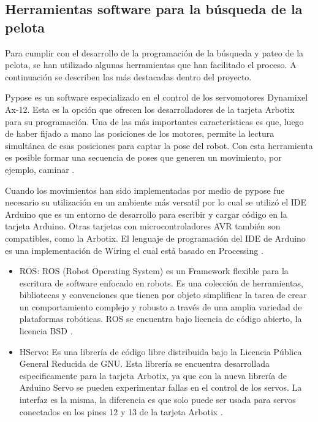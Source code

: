 \subsection{Herramientas software para la b\'usqueda de la pelota } \label{subsection:Herrbusqueda}

Para cumplir con el desarrollo de la programación de la búsqueda y pateo de la pelota, se han utilizado algunas herramientas que han facilitado el proceso. A continuación se describen las más destacadas dentro del proyecto. 

Pypose es un software especializado en el control de los servomotores Dynamixel Ax-12. Esta es la opci\'on que ofrecen los desarrolladores de la tarjeta Arbotix para su programaci\'on. Una de las más importantes características es que, luego de haber fijado a mano las posiciones de los motores, permite la lectura simultánea de esas posiciones para captar la pose del robot. Con esta herramienta es posible formar una secuencia de poses que generen un movimiento, por ejemplo, caminar \cite{pypose}. 

Cuando los movimientos han sido implementadas por medio de pypose fue necesario su utilizaci\'on en un ambiente m\'as versatil por lo cual se utiliz\'o el IDE Arduino que es un entorno de desarrollo para escribir y cargar código en la tarjeta Arduino. Otras tarjetas con microcontroladores AVR también son compatibles, como la Arbotix. El lenguaje de programación del IDE de Arduino es una implementación de Wiring el cual está basado en Processing \cite{arduino}.  

\begin{itemize}

\item ROS: ROS (Robot Operating System) es un Framework flexible para la escritura de software enfocado en robots. Es una colección de herramientas, bibliotecas y convenciones que tienen por objeto simplificar la tarea de crear un comportamiento complejo y robusto a través de una amplia variedad de plataformas robóticas. ROS se encuentra bajo licencia de código abierto, la licencia BSD \cite{ros}.

\item HServo: Es una librería de código libre distribuida bajo la Licencia Pública General Reducida de GNU. Esta librería se encuentra desarrollada especificamente para la tarjeta Arbotix, ya que con la nueva librería de Arduino Servo se pueden experimentar fallas en el control de los servos. La interfaz es la misma, la diferencia es que solo puede ser usada para servos conectados en los pines 12 y 13 de la tarjeta Arbotix \cite{HServo}.    

\end{itemize}

